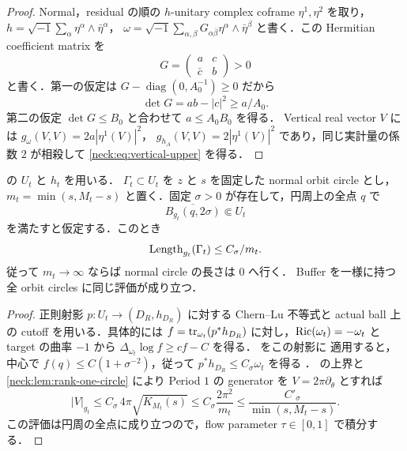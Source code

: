 \begin{proof}
Normal，residual の順の $h$-unitary complex coframe $\eta^1,\eta^2$ を取り，
$h=\sqrt{-1}\sum_\alpha\eta^\alpha\wedge\bar\eta^\alpha$，
$\omega=\sqrt{-1}\sum_{\alpha,\beta}G_{\alpha\bar\beta}
\eta^\alpha\wedge\bar\eta^\beta$ と書く．この Hermitian coefficient matrix を
\[
 G=\begin{pmatrix}a&c\\\bar c&b\end{pmatrix}>0
\]
と書く．第一の仮定は
$G-\operatorname{diag}(0,A_0^{-1})\ge0$ だから
\[
 \det G=a b-|c|^2\ge a/A_0.
\]
第二の仮定 $\det G\le B_0$ と合わせて $a\le A_0B_0$ を得る．
Vertical real vector $V$ には
$g_\omega(V,V)=2a|\eta^1(V)|^2$，
$g_{h_A}(V,V)=2|\eta^1(V)|^2$ であり，同じ実計量の係数 $2$ が相殺して
\eqref{neck:eq:vertical-upper} を得る．
\end{proof}

\begin{corollary}
\label{neck:cor:buffer-circle}
 の $U_t$ と $h_t$ を用いる．
$\Gamma_t\subset U_t$ を $z$ と $s$ を固定した normal orbit circle とし，
$m_t=\min(s,M_t-s)$ と置く．固定 $\sigma>0$ が存在して，円周上の全点 $q$ で
\begin{equation}\label{neck:eq:actual-circle-buffer}
 \overline{B_{g_t}(q,2\sigma)}\Subset U_t
\end{equation}
を満たすと仮定する．このとき
\[
 \operatorname{Length}_{g_t}(\Gamma_t)\le C_\sigma/m_t.
\]
従って $m_t\to\infty$ ならば normal circle の長さは $0$ へ行く．
Buffer を一様に持つ全 orbit circles に同じ評価が成り立つ．
\end{corollary}

\begin{proof}
正則射影 $p:U_t\to(D_R,h_{D_R})$ に対する Chern--Lu 不等式と
actual ball 上の cutoff を用いる．具体的には
$f=\operatorname{tr}_{\omega_t}(p^*h_{D_R})$ に対し，$\operatorname{Ric}(\omega_t)=-\omega_t$ と
target の曲率 $-1$ から
$\Delta_{\omega_t}\log f\ge c f-C$ を得る．
 をこの射影に
適用すると，中心で $f(q)\le C(1+\sigma^{-2})$，従って
$p^*h_{D_R}\le C_\sigma\omega_t$ を得る
\cite[Section~1 and Theorem~2 の証明]{YauSchwarzThm2}．
 の上界と
\cref{neck:lem:rank-one-circle} により
Period $1$ の generator を $V=2\pi\partial_\theta$ とすれば
\[
 |V|_{g_t}
 \le C_\sigma\,4\pi\sqrt{K_{M_t}(s)}
 \le C_\sigma\frac{2\pi^2}{m_t}
 \le\frac{C'_\sigma}{\min(s,M_t-s)}.
\]
この評価は円周の全点に成り立つので，flow parameter $\tau\in[0,1]$ で積分する．
\end{proof}

